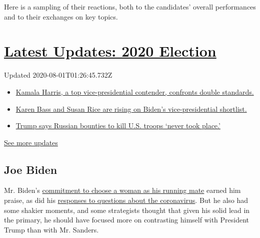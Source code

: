 Here is a sampling of their reactions, both to the candidates' overall
performances and to their exchanges on key topics.

\hypertarget{latest-updates-2020-election}{%
\section{\texorpdfstring{\href{https://www.nytimes.com/2020/07/31/us/elections/biden-vs-trump.html?action=click\&pgtype=Article\&state=default\&region=MAIN_CONTENT_1\&context=storylines_live_updates}{Latest
Updates: 2020
Election}}{Latest Updates: 2020 Election}}\label{latest-updates-2020-election}}

Updated 2020-08-01T01:26:45.732Z

\begin{itemize}
\tightlist
\item
  \href{https://www.nytimes.com/2020/07/31/us/elections/biden-vs-trump.html?action=click\&pgtype=Article\&state=default\&region=MAIN_CONTENT_1\&context=storylines_live_updates\#link-29fdff45}{Kamala
  Harris, a top vice-presidential contender, confronts double
  standards.}
\item
  \href{https://www.nytimes.com/2020/07/31/us/elections/biden-vs-trump.html?action=click\&pgtype=Article\&state=default\&region=MAIN_CONTENT_1\&context=storylines_live_updates\#link-13ec3d9c}{Karen
  Bass and Susan Rice are rising on Biden's vice-presidential
  shortlist.}
\item
  \href{https://www.nytimes.com/2020/07/31/us/elections/biden-vs-trump.html?action=click\&pgtype=Article\&state=default\&region=MAIN_CONTENT_1\&context=storylines_live_updates\#link-49e9a016}{Trump
  says Russian bounties to kill U.S. troops `never took place.'}
\end{itemize}

\href{https://www.nytimes.com/2020/07/31/us/elections/biden-vs-trump.html?action=click\&pgtype=Article\&state=default\&region=MAIN_CONTENT_1\&context=storylines_live_updates}{See
more updates}

\hypertarget{joe-biden}{%
\subsection{Joe Biden}\label{joe-biden}}

Mr. Biden's
\href{https://www.nytimes.com/2020/03/15/us/politics/joe-biden-female-vice-president.html}{commitment
to choose a woman as his running mate} earned him praise, as did his
\href{https://www.nytimes.com/video/us/politics/100000007035872/biden-pandemic.html}{responses
to questions about the coronavirus}. But he also had some shakier
moments, and some strategists thought that given his solid lead in the
primary, he should have focused more on contrasting himself with
President Trump than with Mr. Sanders.

